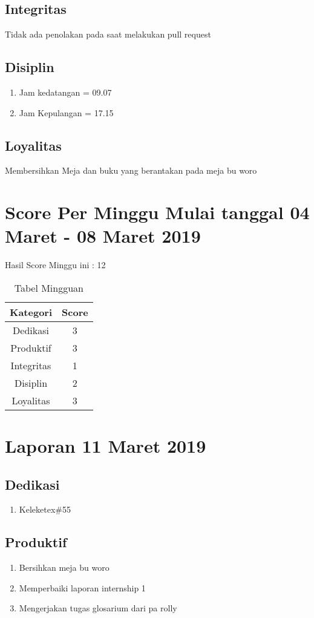 \subsection{Integritas}
Tidak ada penolakan pada saat melakukan pull request
\subsection{Disiplin}
\begin{enumerate}
\item Jam kedatangan = 09.07
\item Jam Kepulangan = 17.15
\end{enumerate}
\subsection{Loyalitas}
 Membersihkan Meja dan buku yang berantakan pada meja bu woro

\section {Score Per Minggu Mulai tanggal 04 Maret - 08 Maret 2019}
Hasil Score Minggu ini : 12
\begin{table}[h]
\caption{Tabel Mingguan}
\centering
\begin{tabular}{|c|c|}
\hline
\textbf{Kategori}&\textbf{Score}\\
\hline
Dedikasi&3\\
\hline
Produktif&3\\
\hline
Integritas&1\\
\hline
Disiplin&2\\
\hline
Loyalitas&3\\
\hline
\end{tabular}
\label{tsble:Laporan mingguan}
\end{table}

\section{Laporan 11 Maret 2019}
\subsection{Dedikasi}
\begin{enumerate}
\item Keleketex\#55
\end{enumerate}
\subsection{Produktif}
\begin{enumerate}
\item Bersihkan meja bu woro
\item Memperbaiki laporan internship 1
\item Mengerjakan tugas glosarium dari pa rolly
\end{enumerate}
